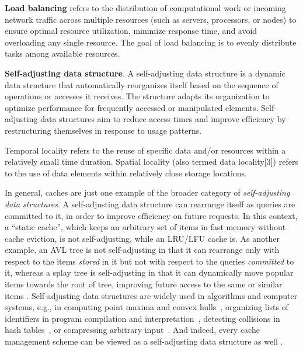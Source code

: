\textbf{Load balancing} refers to the distribution of computational work or incoming network traffic across multiple resources (such as servers, processors, or nodes) to ensure optimal resource utilization, minimize response time, and avoid overloading any single resource. The goal of load balancing is to evenly distribute tasks among available resources.

\textbf{Self-adjusting data structure}.
A self-adjusting data structure is a dynamic data structure that automatically reorganizes itself based on the sequence of operations or accesses it receives. The structure adapts its organization to optimize performance for frequently accessed or manipulated elements. Self-adjusting data structures aim to reduce access times and improve efficiency by restructuring themselves in response to usage patterns.


Temporal locality refers to the reuse of specific data and/or resources within a relatively small time duration. Spatial locality (also termed data locality[3]) refers to the use of data elements within relatively close storage locations.

In general, caches are just one example of the broader category of \emph{self-adjusting data structures}. A self-adjusting data structure can rearrange itself as queries are committed to it, in order to improve efficiency on future requests. In this context, a ``static cache'', which keeps an arbitrary set of items in fast memory without cache eviction, is not self-adjusting, while an LRU\slash LFU cache is. As another example, an AVL tree is not self-adjusting in that it can rearrange only with respect to the items \emph{stored} in it but not with respect to the queries \emph{committed} to it, whereas a splay tree is self-adjusting in that it can dynamically move popular items towards the root of tree, improving future access to the same or similar items \cite{SleatorT85Splay, BoseDL08, Avin0020}. Self-adjusting data structures are widely used in algorithms and computer systems, e.g., in computing point maxima and convex hulls~\cite{BentleyCL93}, organizing lists of identifiers in program compilation and interpretation~\cite{HesterH85}, detecting collisions in hash tables~\cite{HesterH85}, or compressing arbitrary input~\cite{BentleySTW86}. And indeed, every cache management scheme can be viewed as a self-adjusting data structure as well %
\cite{SleatorT85}.  %


